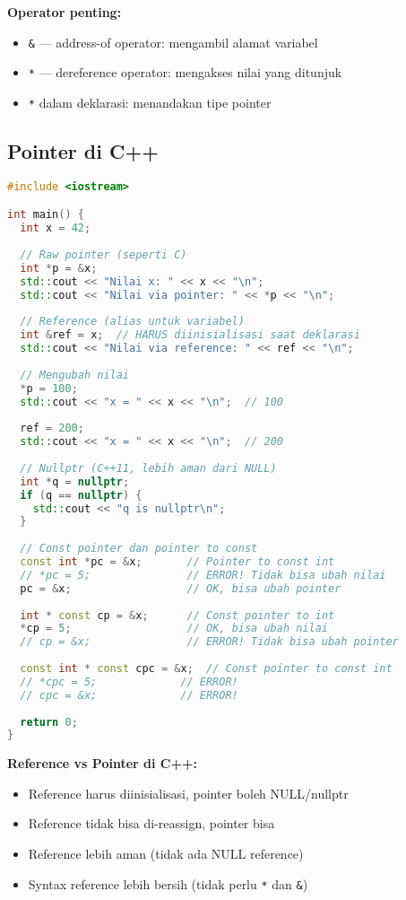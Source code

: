 \documentclass[../main.tex]{subfiles}
\begin{document}
\textbf{Operator penting:}
\begin{itemize}
  \item \texttt{\&} --- address-of operator: mengambil alamat variabel
  \item \texttt{*} --- dereference operator: mengakses nilai yang ditunjuk
  \item \texttt{*} dalam deklarasi: menandakan tipe pointer
\end{itemize}

\subsection{Pointer di C++}

\begin{lstlisting}[language=C++, caption={Pointer dan reference di C++}]
#include <iostream>

int main() {
  int x = 42;
  
  // Raw pointer (seperti C)
  int *p = &x;
  std::cout << "Nilai x: " << x << "\n";
  std::cout << "Nilai via pointer: " << *p << "\n";
  
  // Reference (alias untuk variabel)
  int &ref = x;  // HARUS diinisialisasi saat deklarasi
  std::cout << "Nilai via reference: " << ref << "\n";
  
  // Mengubah nilai
  *p = 100;
  std::cout << "x = " << x << "\n";  // 100
  
  ref = 200;
  std::cout << "x = " << x << "\n";  // 200
  
  // Nullptr (C++11, lebih aman dari NULL)
  int *q = nullptr;
  if (q == nullptr) {
    std::cout << "q is nullptr\n";
  }
  
  // Const pointer dan pointer to const
  const int *pc = &x;       // Pointer to const int
  // *pc = 5;               // ERROR! Tidak bisa ubah nilai
  pc = &x;                  // OK, bisa ubah pointer
  
  int * const cp = &x;      // Const pointer to int
  *cp = 5;                  // OK, bisa ubah nilai
  // cp = &x;               // ERROR! Tidak bisa ubah pointer
  
  const int * const cpc = &x;  // Const pointer to const int
  // *cpc = 5;             // ERROR!
  // cpc = &x;             // ERROR!
  
  return 0;
}
\end{lstlisting}

\textbf{Reference vs Pointer di C++:}
\begin{itemize}
  \item Reference harus diinisialisasi, pointer boleh NULL/nullptr
  \item Reference tidak bisa di-reassign, pointer bisa
  \item Reference lebih aman (tidak ada NULL reference)
  \item Syntax reference lebih bersih (tidak perlu \texttt{*} dan \texttt{\&})
\end{itemize}
\end{document}
